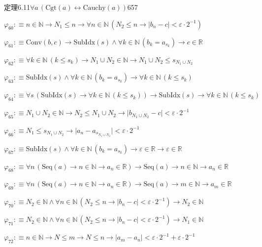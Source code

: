 \begin{fullproof}{定理6.11}{$\forall a\,(\mathrm{Cgt}(a) \leftrightarrow \mathrm{Cauchy}(a))$}{657}
\begin{abbrevlist}
\item $\varphi_{60} :\equiv n \in \mathbb{N} \to N_{1} \leq n \to \forall n \in \mathbb{N}\,(N_{2} \leq n \to \lvert b_{n} - c \rvert < \varepsilon \cdot 2^{-1})$
\item $\varphi_{61} :\equiv \mathrm{Conv}(b,c) \to \mathrm{SubIdx}(s) \land \forall k \in \mathbb{N}\,(b_{k} = a_{s_{k}}) \to c \in \mathbb{R}$
\item $\varphi_{62} :\equiv \forall k \in \mathbb{N}\,(k \leq s_{k}) \to N_{1} \cup N_{2} \in \mathbb{N} \to N_{1} \cup N_{2} \leq s_{N_{1} \cup N_{2}}$
\item $\varphi_{63} :\equiv \mathrm{SubIdx}(s) \land \forall k \in \mathbb{N}\,(b_{k} = a_{s_{k}}) \to \forall k \in \mathbb{N}\,(k \leq s_{k})$
\item $\varphi_{64} :\equiv \forall s\,(\mathrm{SubIdx}(s) \to \forall k \in \mathbb{N}\,(k \leq s_{k})) \to \mathrm{SubIdx}(s) \to \forall k \in \mathbb{N}\,(k \leq s_{k})$
\item $\varphi_{65} :\equiv N_{1} \cup N_{2} \in \mathbb{N} \to N_{2} \leq N_{1} \cup N_{2} \to \lvert b_{N_{1} \cup N_{2}} - c \rvert < \varepsilon \cdot 2^{-1}$
\item $\varphi_{66} :\equiv N_{1} \leq s_{N_{1} \cup N_{2}} \to \lvert a_{n} - a_{s_{N_{1} \cup N_{2}}} \rvert < \varepsilon \cdot 2^{-1}$
\item $\varphi_{67} :\equiv \mathrm{SubIdx}(s) \land \forall k \in \mathbb{N}\,(b_{k} = a_{s_{k}}) \to \varepsilon \in \mathbb{R} \to \varepsilon \in \mathbb{R}$
\item $\varphi_{68} :\equiv \forall n\,(\mathrm{Seq}(a) \to n \in \mathbb{N} \to a_{n} \in \mathbb{R}) \to \mathrm{Seq}(a) \to n \in \mathbb{N} \to a_{n} \in \mathbb{R}$
\item $\varphi_{69} :\equiv \forall n\,(\mathrm{Seq}(a) \to n \in \mathbb{N} \to a_{n} \in \mathbb{R}) \to \mathrm{Seq}(a) \to m \in \mathbb{N} \to a_{m} \in \mathbb{R}$
\item $\varphi_{70} :\equiv N_{2} \in \mathbb{N} \land \forall n \in \mathbb{N}\,(N_{2} \leq n \to \lvert b_{n} - c \rvert < \varepsilon \cdot 2^{-1}) \to N_{2} \in \mathbb{N}$
\item $\varphi_{71} :\equiv N_{2} \in \mathbb{N} \land \forall n \in \mathbb{N}\,(N_{2} \leq n \to \lvert b_{n} - c \rvert < \varepsilon \cdot 2^{-1}) \to N_{1} \in \mathbb{N}$
\item $\varphi_{72} :\equiv n \in \mathbb{N} \to N \leq m \to N \leq n \to \lvert a_{m} - a_{n} \rvert < \varepsilon \cdot 2^{-1} + \varepsilon \cdot 2^{-1}$

\end{abbrevlist}
\end{fullproof}
